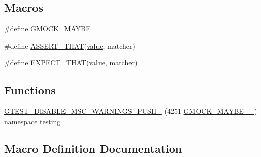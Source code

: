 \subsection*{Macros}
\begin{DoxyCompactItemize}
\item 
\#define \mbox{\hyperlink{googletest-master_2googlemock_2include_2gmock_2gmock-matchers_8h_a2e98579585b1c3e77613384612912612}{G\+M\+O\+C\+K\+\_\+\+M\+A\+Y\+B\+E\+\_\+\_\+}}
\item 
\#define \mbox{\hyperlink{googletest-master_2googlemock_2include_2gmock_2gmock-matchers_8h_a41d888579850c16583baea33ee8d057e}{A\+S\+S\+E\+R\+T\+\_\+\+T\+H\+AT}}(\mbox{\hyperlink{_obj__test_2lib_2googletest-master_2googlemock_2test_2gmock-matchers__test_8cc_a337b8a670efc0b086ad3af163f3121b6}{value}},  matcher)
\item 
\#define \mbox{\hyperlink{googletest-master_2googlemock_2include_2gmock_2gmock-matchers_8h_ac31e206123aa702e1152bb2735b31409}{E\+X\+P\+E\+C\+T\+\_\+\+T\+H\+AT}}(\mbox{\hyperlink{_obj__test_2lib_2googletest-master_2googlemock_2test_2gmock-matchers__test_8cc_a337b8a670efc0b086ad3af163f3121b6}{value}},  matcher)
\end{DoxyCompactItemize}
\subsection*{Functions}
\begin{DoxyCompactItemize}
\item 
\mbox{\hyperlink{googletest-master_2googlemock_2include_2gmock_2gmock-matchers_8h_a76d5edfe42aefbbbf81289a6a12f3761}{G\+T\+E\+S\+T\+\_\+\+D\+I\+S\+A\+B\+L\+E\+\_\+\+M\+S\+C\+\_\+\+W\+A\+R\+N\+I\+N\+G\+S\+\_\+\+P\+U\+S\+H\+\_\+}} (4251 \mbox{\hyperlink{_obj__test_2lib_2googletest-master_2googlemock_2include_2gmock_2gmock-matchers_8h_a2e98579585b1c3e77613384612912612}{G\+M\+O\+C\+K\+\_\+\+M\+A\+Y\+B\+E\+\_\+\_\+}}) namespace testing
\end{DoxyCompactItemize}


\subsection{Macro Definition Documentation}
\mbox{\label{googletest-master_2googlemock_2include_2gmock_2gmock-matchers_8h_a41d888579850c16583baea33ee8d057e}} 
